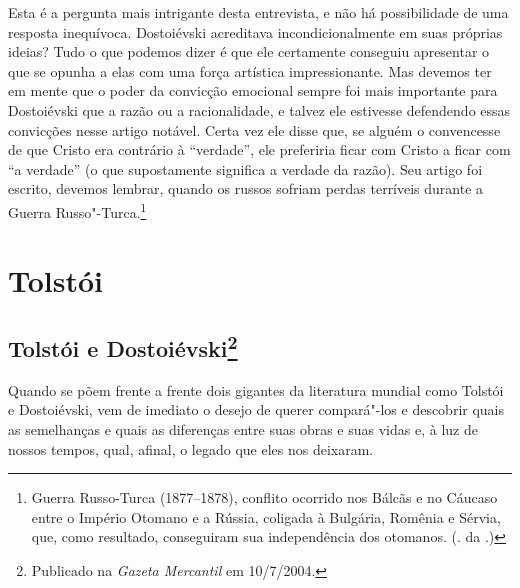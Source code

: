 Esta é a pergunta mais intrigante desta entrevista, e não há
possibilidade de uma resposta inequívoca. Dostoiévski acreditava
incondicionalmente em suas próprias ideias? Tudo o que podemos dizer é
que ele certamente conseguiu apresentar o que se opunha a elas com uma
força artística impressionante. Mas devemos ter em mente que o poder da
convicção emocional sempre foi mais importante para Dostoiévski que a
razão ou a racionalidade, e talvez ele estivesse defendendo essas
convicções nesse artigo notável. Certa vez ele disse que, se alguém o
convencesse de que Cristo era contrário à ``verdade'', ele preferiria ficar
com Cristo a ficar com ``a verdade'' (o que supostamente significa a
verdade da razão). Seu artigo foi escrito, devemos lembrar, quando os
russos sofriam perdas terríveis durante a Guerra Russo"-Turca.\footnote{Guerra Russo-Turca (1877--1878), conflito ocorrido nos Bálcãs e no Cáucaso entre o Império Otomano e a Rússia, coligada à Bulgária, Romênia e Sérvia, que, como resultado, conseguiram sua independência dos otomanos. (. da .)}

\bigskip



\part{Tolstói}

\chapter{Tolstói e Dostoiévski\footnote{Publicado na \emph{Gazeta Mercantil} em 10/7/2004.}}

Quando se põem frente a frente dois gigantes da literatura mundial
como Tolstói e Dostoiévski, vem de imediato o desejo de querer
compará"-los e descobrir quais as semelhanças e quais as
diferenças entre suas obras e suas vidas e, à luz de nossos
tempos, qual, afinal, o legado que eles nos deixaram. 

